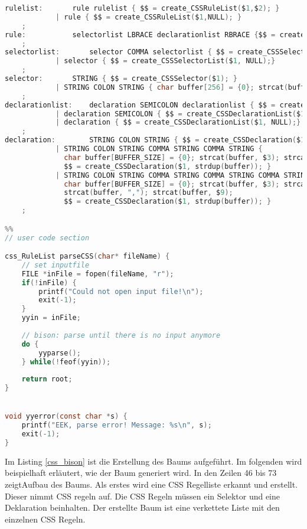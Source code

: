 \begin{lstlisting}[label=css_bison,language=C, caption=Baumgenerierung mit Bison]
rulelist:		rule rulelist { $$ = create_CSSRuleList($1,$2); }
			| rule { $$ = create_CSSRuleList($1,NULL); }
	;
rule:			selectorlist LBRACE declarationlist RBRACE {$$ = create_CSSRule($1, $3); }
	;
selectorlist:		selector COMMA selectorlist { $$ = create_CSSSelectorList($1,$3);}
			| selector { $$ = create_CSSSelectorList($1, NULL);}
	;			
selector:		STRING { $$ = create_CSSSelector($1); }
			| STRING COLON STRING { char buffer[256] = {0}; strcat(buffer, $1); strcat(buffer, ":"); strcat(buffer, $3);  $$ = create_CSSSelector(strdup(buffer)); }
	;
declarationlist: 	declaration SEMICOLON declarationlist { $$ = create_CSSDeclarationList($1,$3);}
			| declaration SEMICOLON { $$ = create_CSSDeclarationList($1, NULL);}
			| declaration { $$ = create_CSSDeclarationList($1, NULL);}
	;				
declaration:		STRING COLON STRING { $$ = create_CSSDeclaration($1, $3); }
			| STRING COLON STRING COMMA STRING COMMA STRING { 
			  char buffer[BUFFER_SIZE] = {0}; strcat(buffer, $3); strcat(buffer, ","); strcat(buffer, $5); strcat(buffer, ","); strcat(buffer, $7);
			  $$ = create_CSSDeclaration($1, strdup(buffer)); }
			| STRING COLON STRING COMMA STRING COMMA STRING COMMA STRING { 
			  char buffer[BUFFER_SIZE] = {0}; strcat(buffer, $3); strcat(buffer, ","); strcat(buffer, $5); strcat(buffer, ","); strcat(buffer, $7);
			  strcat(buffer, ","); strcat(buffer, $9); 
			  $$ = create_CSSDeclaration($1, strdup(buffer)); }
	;

%%
// user code section

css_RuleList parseCSS(char* fileName) {
    // set inputfile
    FILE *inFile = fopen(fileName, "r");
    if(!inFile) {
        printf("Could not open input file!\n");
        exit(-1);
    }
    yyin = inFile;
    
    // bison: parse until there is no input anymore
    do {
        yyparse();
    } while(!feof(yyin));
   	
    return root;
}


void yyerror(const char *s) {
    printf("EEK, parse error! Message: %s\n", s);
    exit(-1);
}
\end{lstlisting}

Im Listing \ref{css_bison} ist die Erstellung des Baums aufgeführt. Im folgenden wird beispielhaft erläutert, wie der Baum generiert wird. In den Zeilen 46 bis 73 zeigtAufbau des Baums. Als erstes wird eine CSS Regelliste erkannt und erstellt. Dieser nimmt CSS regeln auf. Die CSS Regeln müssen ein Selektor und eine Deklaration beinhalten. Der erstellte Baum ist eine verkettete Liste mit den einzelnen CSS Regeln.
